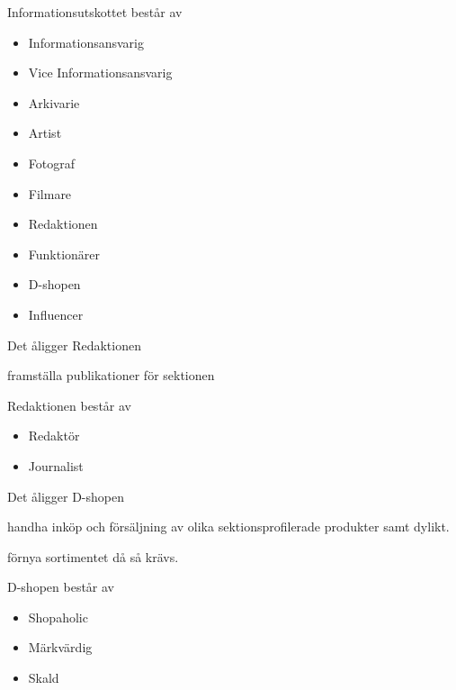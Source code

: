 \documentclass[pdfbookmarks,a4paper,11pt]{article}
\newlength{\itemcollength}
\newenvironment{reglemlista}{%
  \begin{list}{}{%
      \setlength{\labelwidth}{\itemcollength}%
      \setlength{\leftmargin}{\labelwidth + \labelsep}%
      \renewcommand{\makelabel}[1]{%
        \raisebox{0pt}[1ex][0pt]{%
          \makebox[\labelwidth][l]{%
            \parbox[t]{\itemcollength}{%
              \raggedright\hspace{0pt}##1}}}\hfill}%
      }}{%
  \end{list}}
\begin{document}
\begin{reglemlista}
\begin{reglemlista}
	\item[Sammansättning]
	Informationsutskottet består av
	\begin{itemize}
		\item Informationsansvarig
		\item Vice Informationsansvarig
		\item Arkivarie
		\item Artist
		\item Fotograf
		\item Filmare
    \item Redaktionen
		\item Funktionärer
    \item D-shopen
    \item Influencer
	\end{itemize}


    \item[\textbf{Redaktionen}]

    \item[Åliggande]
    Det åligger Redaktionen
    \begin{attlista}
	\item framställa publikationer för sektionen
    \end{attlista}

    \item[Sammansättning]
    Redaktionen består av 
    \begin{itemize}
        \item Redaktör
        \item Journalist
    \end{itemize}

\end{reglemlista}


	\item[\textbf{D-shopen}]

	\item[Åligganden]
	Det åligger D-shopen
	\begin{attlista}
		\item handha inköp och försäljning av olika sektionsprofilerade produkter samt dylikt.
		\item förnya sortimentet då så krävs.
	\end{attlista}
	\item[Sammansättning]
	D-shopen består av
	\begin{itemize}
		\item Shopaholic
		\item Märkvärdig
		\item Skald
	\end{itemize}
\end{reglemlista}
\end{document}
